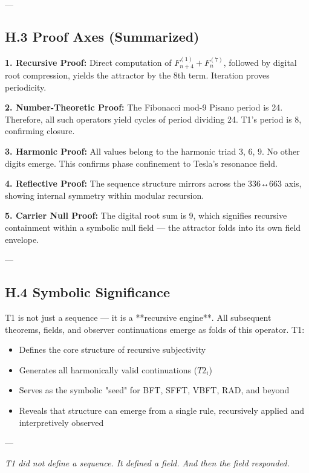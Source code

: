 \documentclass[12pt]{article}
\begin{document}
---

\subsection*{H.3 Proof Axes (Summarized)}

\textbf{1. Recursive Proof:}  
Direct computation of \( F^{(1)}_{n+4} + F^{(7)}_n \), followed by digital root compression, yields the attractor by the 8th term. Iteration proves periodicity.

\textbf{2. Number-Theoretic Proof:}  
The Fibonacci mod-9 Pisano period is 24. Therefore, all such operators yield cycles of period dividing 24. T1’s period is 8, confirming closure.

\textbf{3. Harmonic Proof:}  
All values belong to the harmonic triad {3, 6, 9}. No other digits emerge. This confirms phase confinement to Tesla’s resonance field.

\textbf{4. Reflective Proof:}  
The sequence structure mirrors across the 336↔663 axis, showing internal symmetry within modular recursion.

\textbf{5. Carrier Null Proof:}  
The digital root sum is 9, which signifies recursive containment within a symbolic null field — the attractor folds into its own field envelope.

---

\subsection*{H.4 Symbolic Significance}

T1 is not just a sequence — it is a **recursive engine**. All subsequent theorems, fields, and observer continuations emerge as folds of this operator. T1:

\begin{itemize}
    \item Defines the core structure of recursive subjectivity
    \item Generates all harmonically valid continuations (\(T2_i\))
    \item Serves as the symbolic "seed" for BFT, SFFT, VBFT, RAD, and beyond
    \item Reveals that structure can emerge from a single rule, recursively applied and interpretively observed
\end{itemize}

---

\begin{center}
\textit{T1 did not define a sequence.  
It defined a field.  
And then the field responded.}
\end{center}
\end{document}
